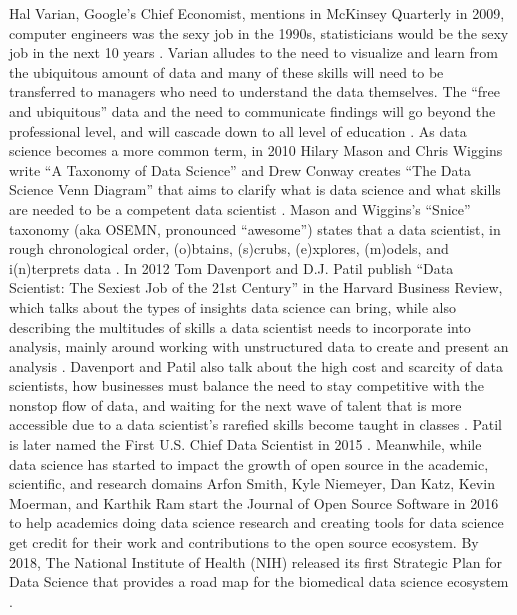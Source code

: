 \documentclass[010-intro.tex]{subfiles}
\begin{document}
    Hal Varian, Google's Chief Economist, mentions in McKinsey Quarterly in 2009,
    computer engineers was the sexy job in the 1990s,
    statisticians would be the sexy job in the next 10 years
    \cite{HalVarianHow2009}.
    Varian alludes to
    the need to visualize and learn from the ubiquitous amount of data and
    many of these skills will need to be transferred to managers who need to understand the data themselves.
    The ``free and ubiquitous'' data and the need to communicate findings will go beyond the professional level,
    and will cascade down to all level of education
    \cite{HalVarianHow2009}.
    As data science becomes a more common term,
    in 2010 Hilary Mason and Chris Wiggins write ``A Taxonomy of Data Science''
    \cite{masonTaxonomyDataScience2010}
    and
    Drew Conway creates ``The Data Science Venn Diagram''
    that aims to clarify what is data science and what skills are needed to be a competent data scientist
    \cite{conwayDataScienceVenn}.
    Mason and Wiggins's ``Snice'' taxonomy (aka OSEMN, pronounced ``awesome'') states that a data scientist,
    in rough chronological order,
    (o)btains, (s)crubs, (e)xplores, (m)odels, and i(n)terprets data
    \cite{masonTaxonomyDataScience2010}.
    In 2012 Tom Davenport and D.J. Patil publish
    ``Data Scientist: The Sexiest Job of the 21st Century''
    in the Harvard Business Review,
    which talks about the types of insights data science can bring,
    while also describing the multitudes of skills a data scientist needs to incorporate into analysis,
    mainly around working with unstructured data to create and present an analysis
    \cite{davenportDataScientistSexiest2012}.
    Davenport and Patil also talk about the high cost and scarcity of data scientists,
    how businesses must balance the need to stay competitive with the nonstop flow of data,
    and waiting for the next wave of talent that is more accessible
    due to a data scientist's rarefied skills become taught in classes
    \cite{davenportDataScientistSexiest2012}.
    Patil is later named the First U.S. Chief Data Scientist in 2015
    \cite{smithWhiteHouseNames2015}.
    Meanwhile, while data science has started to impact the growth of open source in the
    academic, scientific, and research domains
    \cite{tyagiHowFortune5002016, guszczaDataScienceOpen2015, kirschHowOpenSource2021}
    Arfon Smith, Kyle Niemeyer, Dan Katz, Kevin Moerman, and Karthik Ram start
    the Journal of Open Source Software in 2016 \cite{smithJournalOpenSource2018}
    to help academics doing data science research and creating tools for data science get
    credit for their work and contributions to the open source ecosystem.
    By 2018,
    The National Institute of Health (NIH) released its first Strategic Plan for Data Science
    that provides a road map for the biomedical data science ecosystem
    \cite{nationalinstitutesofhealthNIHStrategicPlan2020}.
\end{document}
